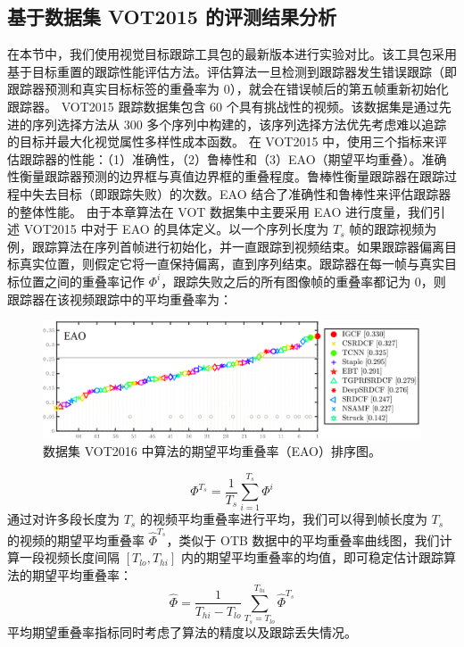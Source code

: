 \subsection{基于数据集 VOT2015 的评测结果分析}
在本节中，我们使用视觉目标跟踪工具包的最新版本进行实验对比。该工具包采用基于目标重置的跟踪性能评估方法。评估算法一旦检测到跟踪器发生错误跟踪（即跟踪器预测和真实目标标签的重叠率为 0），就会在错误帧后的第五帧重新初始化跟踪器。
VOT2015 \cite{Kristan2015TheVO} 跟踪数据集包含 60 个具有挑战性的视频。该数据集是通过先进的序列选择方法从 300 多个序列中构建的，该序列选择方法优先考虑难以追踪的目标并最大化视觉属性多样性成本函数。
在 VOT2015 中，使用三个指标来评估跟踪器的性能：（1）准确性，（2）鲁棒性和（3）EAO（期望平均重叠）。准确性衡量跟踪器预测的边界框与真值边界框的重叠程度。鲁棒性衡量跟踪器在跟踪过程中失去目标（即跟踪失败）的次数。EAO 结合了准确性和鲁棒性来评估跟踪器的整体性能。
由于本章算法在 VOT 数据集中主要采用 EAO 进行度量，我们引述 VOT2015 中对于 EAO 的具体定义。以一个序列长度为 $T_s$ 帧的跟踪视频为例，跟踪算法在序列首帧进行初始化，并一直跟踪到视频结束。如果跟踪器偏离目标真实位置，则假定它将一直保持偏离，直到序列结束。跟踪器在每一帧与真实目标位置之间的重叠率记作 $\Phi^i$，跟踪失败之后的所有图像帧的重叠率都记为 0，则跟踪器在该视频跟踪中的平均重叠率为：
\begin{figure}[t]
    \centering
    \includegraphics[width=1.0\textwidth]{Img/IGCF/vot/eao_rank_vot2016.png}
    \caption{数据集 VOT2016 \cite{Kristan2016TheVO} 中算法的期望平均重叠率（EAO）排序图。}
    \label{fig:vot16}
\end{figure}
\begin{equation}
\Phi^{T_{s}}=\frac{1}{T_{s}} \sum_{i=1}^{T_{s}} \Phi^{i}
\end{equation}
通过对许多段长度为 $T_s$ 的视频平均重叠率进行平均，我们可以得到帧长度为 $T_s$ 的视频的期望平均重叠率 $\hat{\Phi}^{T_{s}}$，类似于 OTB 数据中的平均重叠率曲线图，我们计算一段视频长度间隔 $[T_{lo}, T_{hi}]$ 内的期望平均重叠率的均值，即可稳定估计跟踪算法的期望平均重叠率：
\begin{equation}
\hat{\Phi}=\frac{1}{T_{h i}-T_{l o}} \sum_{T_{s}=T_{l o}}^{T_{h i}} \hat{\Phi}^{T_{s}}
\end{equation}
平均期望重叠率指标同时考虑了算法的精度以及跟踪丢失情况。

